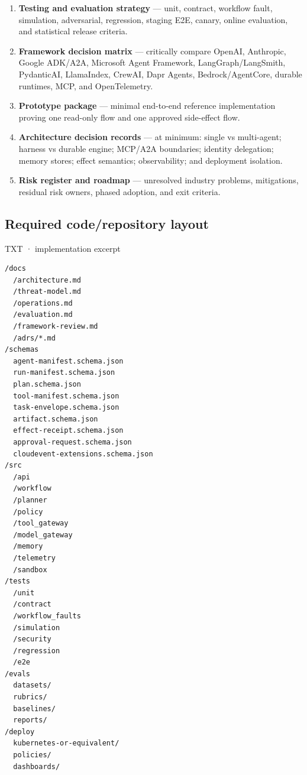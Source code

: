 \begin{enumerate}
\item \textbf{Testing and evaluation strategy} — unit, contract, workflow fault, simulation, adversarial, regression, staging E2E, canary, online evaluation, and statistical release criteria.

\item \textbf{Framework decision matrix} — critically compare OpenAI, Anthropic, Google ADK/A2A, Microsoft Agent Framework, LangGraph/LangSmith, PydanticAI, LlamaIndex, CrewAI, Dapr Agents, Bedrock/AgentCore, durable runtimes, MCP, and OpenTelemetry.

\item \textbf{Prototype package} — minimal end-to-end reference implementation proving one read-only flow and one approved side-effect flow.

\item \textbf{Architecture decision records} — at minimum: single vs multi-agent; harness vs durable engine; MCP/A2A boundaries; identity delegation; memory stores; effect semantics; observability; and deployment isolation.

\item \textbf{Risk register and roadmap} — unresolved industry problems, mitigations, residual risk owners, phased adoption, and exit criteria.

\end{enumerate}

\subsection{Required code/repository layout}

TXT · implementation excerpt\par

\needspace{424.8pt}
\begin{lstlisting}[style=bookcode,title={TEXT}]
/docs
  /architecture.md
  /threat-model.md
  /operations.md
  /evaluation.md
  /framework-review.md
  /adrs/*.md
/schemas
  agent-manifest.schema.json
  run-manifest.schema.json
  plan.schema.json
  tool-manifest.schema.json
  task-envelope.schema.json
  artifact.schema.json
  effect-receipt.schema.json
  approval-request.schema.json
  cloudevent-extensions.schema.json
/src
  /api
  /workflow
  /planner
  /policy
  /tool_gateway
  /model_gateway
  /memory
  /telemetry
  /sandbox
/tests
  /unit
  /contract
  /workflow_faults
  /simulation
  /security
  /regression
  /e2e
/evals
  datasets/
  rubrics/
  baselines/
  reports/
/deploy
  kubernetes-or-equivalent/
  policies/
  dashboards/
\end{lstlisting}

